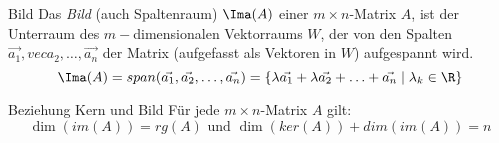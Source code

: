 \begin{definition}{Bild}
    Das \textit{Bild} (auch Spaltenraum) $\Ima(A)$ einer $m\times n$-Matrix $A$,
    ist der Unterraum des $m-$dimensionalen Vektorraums $W$, der von den Spalten
    $\vec{a_1}, vec{a_2}, \ldots, \vec{a_n}$ der Matrix (aufgefasst als Vektoren in $W$) aufgespannt wird.
    \begin{equation*}
        \Ima(A)=span(\vec{a_1}, \vec{a_2}, \ldots, \vec{a_n})
        = \{\lambda\vec{a_1}+\lambda\vec{a_2}+\ldots+\vec{a_n}\mid \lambda_k\in\R\}
    \end{equation*}
\end{definition}

\begin{theorem}{Beziehung Kern und Bild}
    Für jede $m\times n$-Matrix $A$ gilt:
    \begin{equation*}
         \dim(im(A))=rg(A)\text{ und } \dim(ker(A))+dim(im(A))=n
    \end{equation*}
\end{theorem}